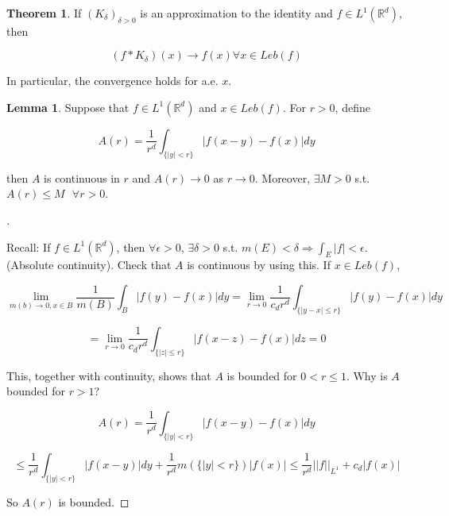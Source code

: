 \documentclass{article}
\theoremstyle{definition}
\newtheorem{thm}{Theorem}
\newtheorem{lem}{Lemma}
\newenvironment{proofs}[1][\proofname]{%
  \begin{proof}[#1]$ $\par\nobreak\ignorespaces
}{%
  \end{proof}
}
\begin{document}
\begin{thm}
  If $(K_\delta)_{\delta > 0}$ is an approximation to the identity and $f \in L^1(\mathbb{R}^d)$, then

  $$(f * K_\delta)(x) \to f(x) \forall x \in Leb(f)$$

  In particular, the convergence holds for a.e. $x$. 
\end{thm}

\begin{lem}
  Suppose that $f \in L^1(\mathbb{R}^d)$ and $x \in Leb(f)$. For $r > 0$, define 

  $$A(r) = \frac{1}{r^d} \int_{\{|y| < r\}} |f(x - y) - f(x)| dy$$

  then $A$ is continuous in $r$ and $A(r) \to 0$ as $r \to 0$. Moreover, $\exists M > 0$ s.t. $A(r) \leq M \text{ } \forall r > 0$. 

\end{lem}

\begin{proofs}
  Recall: If $f \in L^1(\mathbb{R}^d)$, then $\forall \epsilon > 0$, $\exists \delta > 0$ s.t. $m(E) < \delta \Rightarrow \int_E |f| < \epsilon$. (Absolute continuity). Check that $A$ is continuous by using this. If $x \in Leb(f)$, 

  $$\lim_{m(b) \to 0, x \in B} \frac{1}{m(B)} \int_B |f(y) - f(x)| dy = \lim_{r \to 0} \frac{1}{c_d r^d} \int_{\{|y - x| \leq r \}} |f(y) - f(x)| dy$$

  $$= \lim_{r \to 0} \frac{1}{c_dr^d} \int_{\{|z| \leq r\}} |f(x - z) - f(x)| dz = 0$$

  This, together with continuity, shows that $A$ is bounded for $0 < r \leq 1$. Why is $A$ bounded for $r > 1$?

  $$A(r) = \frac{1}{r^d} \int_{\{|y| < r\}} |f(x - y) - f(x)|dy$$

  $$\leq \frac{1}{r^d} \int_{\{|y| < r\}} |f(x - y)| dy + \frac{1}{r^d} m(\{|y| < r\}) |f(x)| \leq \frac{1}{r^d} ||f||_{L^1} + c_d |f(x)|$$

  So $A(r)$ is bounded. 

\end{proofs}
\end{document}
